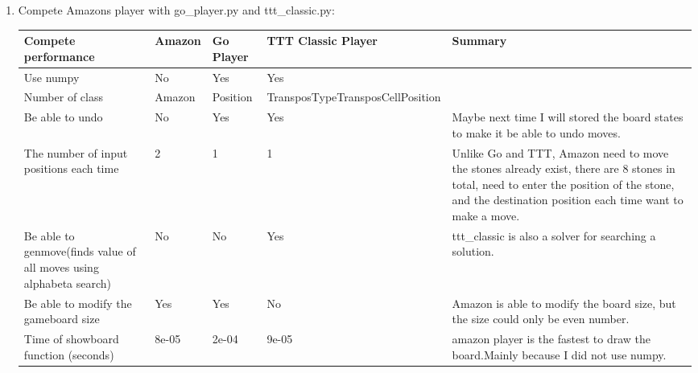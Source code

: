 \documentclass{article}
\begin{document}
\begin{enumerate}
\begin{itemize}
   Also, the player can not change to opponent automatically.\\
   The player is not be able to undo moves so far, that's what I need to keep working on.
   \item If I will continue to work on this project later : 
   I'll try to let the player check the opponent, and change to the opponent automatically after each move.\\
   Also, I will find a better way get all legal moves, maybe make a class for Position like go\_player.py did, making the code looks more clean.\\
   I probably will implement the undo method for my player as well.\\
   Then get a resolver for this game.
   \end{itemize}
   \item Compete Amazons player with go\_player.py and ttt\_classic.py: 
   \begin{center}
    \begin{tabular}{| p{4.5cm} | p{2cm} | p{2cm} | p{2cm} | p{5cm} |}
    \hline
    Compete performance&Amazon & Go Player & TTT Classic Player & Summary \\ \hline
    Use numpy& No & Yes & Yes & \\ \hline
    Number of class & Amazon & Position &TransposType\newline Transpos\newline Cell\newline Position & \\ \hline
    Be able to undo & No & Yes & Yes & Maybe next time I will stored the board states to make it be able to undo moves. \\ \hline
    The number of input positions each time & 2 & 1 & 1 & Unlike Go and TTT, Amazon need to move the stones already exist, there are 8 stones in total, need to enter the position of the stone, and the destination position each time want to make a move. \\ \hline
    Be able to genmove\newline (finds value of all moves using alphabeta search) &No & No & Yes & ttt\_classic is also a solver for searching a solution.\\ \hline
    Be able to modify the gameboard size& Yes & Yes & No & Amazon is able to modify the board size, but the size could only be even number.\\ \hline
    Time of showboard function (seconds) & 8e-05  & 2e-04  & 9e-05 & amazon player is the fastest to draw the board.Mainly because I did not use numpy.\\ \hline

\end{tabular}
\end{center}
\end{enumerate}
\end{document}

